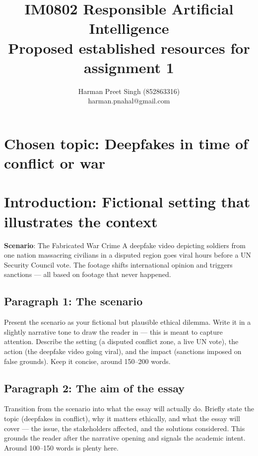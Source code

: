 \documentclass[11pt, a4paper]{article}
\title{\textbf{IM0802 \textendash{} Responsible Artificial Intelligence} \\ Proposed established resources for assignment 1}
\author{Harman Preet Singh (852863316) \\ harman.pnahal@gmail.com}
\begin{document}
\maketitle

\section{Chosen topic: {\normalfont Deepfakes in time of conflict or war}}



\section{Introduction: {\normalfont Fictional setting that illustrates the context}}

\textbf{Scenario}: The Fabricated War Crime
A deepfake video depicting soldiers from one nation massacring civilians in a disputed region goes viral hours before a UN Security Council vote. The footage shifts international opinion and triggers sanctions — all based on footage that never happened.

\subsection{Paragraph 1: {\normalfont The scenario}}
Present the scenario as your fictional but plausible ethical dilemma. Write it in a slightly narrative tone to draw the reader in — this is meant to capture attention. Describe the setting (a disputed conflict zone, a live UN vote), the action (the deepfake video going viral), and the impact (sanctions imposed on false grounds). Keep it concise, around 150–200 words.

\subsection{Paragraph 2: {\normalfont The aim of the essay}}
Transition from the scenario into what the essay will actually do. Briefly state the topic (deepfakes in conflict), why it matters ethically, and what the essay will cover — the issue, the stakeholders affected, and the solutions considered. This grounds the reader after the narrative opening and signals the academic intent. Around 100–150 words is plenty here.
\end{document}
